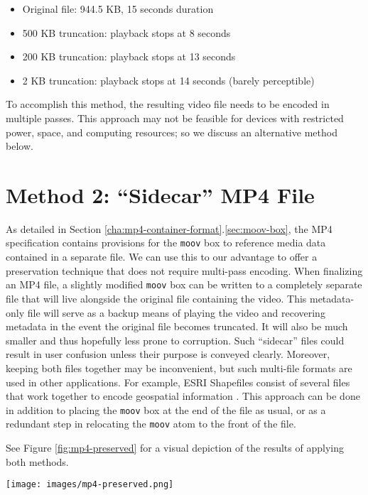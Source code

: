\begin{itemize}
	\item Original file: 944.5 KB, 15 seconds duration
	\item 500 KB truncation: playback stops at 8 seconds
	\item 200 KB truncation: playback stops at 13 seconds
	\item 2 KB truncation: playback stops at 14 seconds (barely perceptible)
\end{itemize}

To accomplish this method, the resulting video file needs to be encoded in multiple passes. This approach may not be feasible for devices with restricted power, space, and computing resources; so we discuss an alternative method below.

\section{Method 2: ``Sidecar'' MP4 File}

As detailed in Section \ref{cha:mp4-container-format}.\ref{sec:moov-box}, the MP4 specification contains provisions for the \texttt{moov} box to reference media data contained in a separate file. We can use this to our advantage to offer a preservation technique that does not require multi-pass encoding. When finalizing an MP4 file, a slightly modified \texttt{moov} box can be written to a completely separate file that will live alongside the original file containing the video. This metadata-only file will serve as a backup means of playing the video and recovering metadata in the event the original file becomes truncated. It will also be much smaller and thus hopefully less prone to corruption. Such ``sidecar'' files could result in user confusion unless their purpose is conveyed clearly. Moreover, keeping both files together may be inconvenient, but such multi-file formats are used in other applications. For example, ESRI Shapefiles consist of several files that work together to encode geospatial information \cite{esri1998}. This approach can be done in addition to placing the \texttt{moov} box at the end of the file as usual, or as a redundant step in relocating the \texttt{moov} atom to the front of the file.

See Figure \ref{fig:mp4-preserved} for a visual depiction of the results of applying both methods.

\begin{figure*}[htb]
	\centering
	\texttt{[image: images/mp4-preserved.png]}
	\caption{Combination of proposed methods for hardening MP4 files against truncation: Method 1 (left) relocates the \texttt{moov} box to the beginning of the file. Method 2 (right) writes a separate metadata-only sidecar file that references the media data in the original file.}
	\label{fig:mp4-preserved}
\end{figure*}



